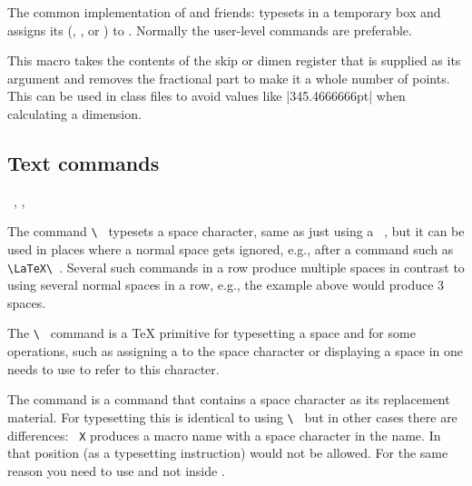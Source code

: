 \documentclass{l3in2edoc}
\begin{document}
\begin{function}[]
  {
    \@settodim
  }
  \begin{syntax}
       
  \end{syntax}
  The common implementation of  and friends: typesets
   in a temporary box and assigns its
   (, , or ) to
  . Normally the user-level commands are preferable.

\end{function}
\publicreaders{}



\begin{function}[]
  {
    \@settopoint
  }
  \begin{syntax}
     
  \end{syntax}
   This macro takes the contents of the skip or dimen register that is
   supplied as its argument and removes the fractional part to make
   it a whole number of points. This can be used in class files to
   avoid values like |345.4666666pt| when calculating a dimension.
\end{function}




\subsection{Text commands}


\begin{function}[user]
  {
    \ ,
    \space,
  }
  \begin{syntax}
    \cs{\space} \cs{\space} \cs{\space}
  \end{syntax}
  The command \verb*=\ = typesets a space character, same as just
  using a \verb*= =, but it can be used in places where a normal space
  gets ignored, e.g., after a command such as \verb*=\LaTeX\ =. Several
  such commands in a row produce multiple spaces in contrast to using
  several normal spaces in a row, e.g., the example above would produce 3
  spaces.

  The \verb*=\ = command is a \TeX{} primitive for typesetting a space
  and for some operations, such as assigning a  to the
  space character or displaying a space in  one needs to
  use \cs{\space} to refer to this character.

  The command  is a command that contains a space character
  as its replacement material. For typesetting this is identical to
  using \verb*=\ = but in other cases there are differences:
  \texttt{ X} produces a macro name with a space
  character in the name. In that position \cs{\space} (as a
  typesetting instruction) would not be allowed. For the same reason
  you need to use  and not \cs{\space} inside .

\end{function}
\end{document}
